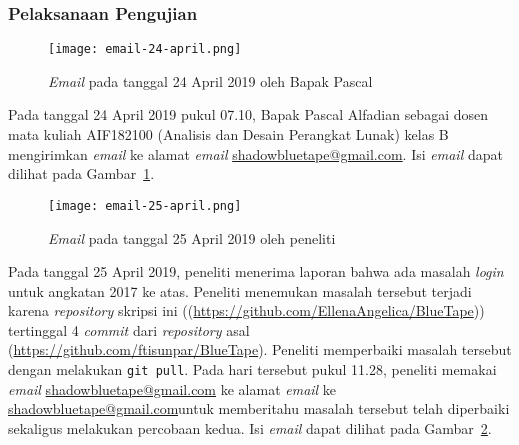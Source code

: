 \subsubsection{Pelaksanaan Pengujian}
\begin{figure}[H]
	\centering  
	\texttt{[image: email-24-april.png]}  
	\caption[\textit{Email} pada tanggal 24 April 2019 oleh Bapak Pascal]{\textit{Email} pada tanggal 24 April 2019 oleh Bapak Pascal} 
	\label{fig:email-24Apr} 
\end{figure} 

Pada tanggal 24 April 2019 pukul 07.10, Bapak Pascal Alfadian sebagai dosen mata kuliah AIF182100 (Analisis dan Desain Perangkat Lunak) kelas B mengirimkan \textit{email} ke alamat \textit{email} \href{mailto:shadowbluetape@gmail.com}{shadowbluetape@gmail.com}. Isi \textit{email} dapat dilihat pada Gambar~\ref{fig:email-24Apr}. 

\begin{figure}[H]
	\centering  
	\texttt{[image: email-25-april.png]}  
	\caption[\textit{Email} pada tanggal 25 April 2019 oleh peneliti]{\textit{Email} pada tanggal 25 April 2019 oleh peneliti} 
	\label{fig:email-25Apr} 
\end{figure}

Pada tanggal 25 April 2019, peneliti menerima laporan bahwa ada masalah \textit{login} untuk angkatan 2017 ke atas. Peneliti menemukan masalah tersebut terjadi karena \textit{repository} skripsi ini ((\url{https://github.com/EllenaAngelica/BlueTape})) tertinggal 4 \textit{commit} dari \textit{repository} asal (\url{https://github.com/ftisunpar/BlueTape}). Peneliti memperbaiki masalah tersebut dengan melakukan \texttt{git pull}. Pada hari tersebut pukul 11.28, peneliti memakai \textit{email} \href{mailto:shadowbluetape@gmail.com}{shadowbluetape@gmail.com} ke alamat \textit{email} ke \href{mailto:shadowbluetape@gmail.com}{shadowbluetape@gmail.com}untuk memberitahu masalah tersebut telah diperbaiki sekaligus melakukan percobaan kedua. Isi \textit{email} dapat dilihat pada Gambar~\ref{fig:email-25Apr}.

